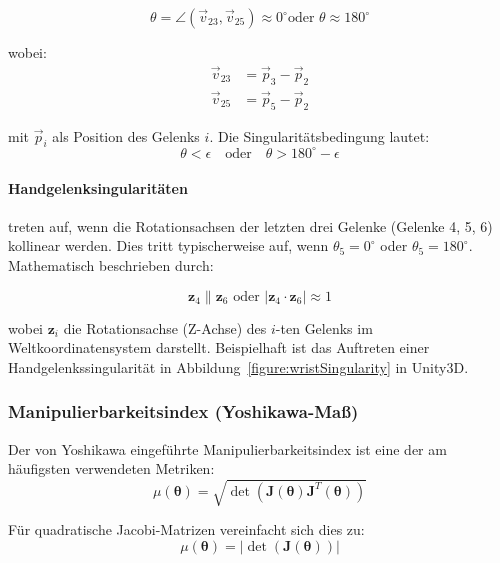 \begin{equation}
  \theta = \angle(\vec{v}_{23}, \vec{v}_{25}) \approx 0^\circ \text{
  oder } \theta \approx 180^\circ
  \label{eq:elbow_singularity}
\end{equation}

wobei:
\begin{align}
  \vec{v}_{23} & = \vec{p}_3 - \vec{p}_2 \\
  \vec{v}_{25} & = \vec{p}_5 - \vec{p}_2
\end{align}

mit $\vec{p}_i$ als Position des Gelenks $i$. Die Singularitätsbedingung lautet:
\begin{equation}
  \theta < \epsilon \quad \text{oder} \quad \theta > 180^\circ - \epsilon
\end{equation}

\paragraph{Handgelenksingularitäten} treten auf, wenn die Rotationsachsen der
letzten drei Gelenke (Gelenke 4, 5, 6) kollinear werden. Dies tritt
typischerweise auf, wenn $\theta_5 = 0^\circ$ oder $\theta_5 =
180^\circ$. Mathematisch
beschrieben durch:

\begin{equation}
  \mathbf{z}_4 \parallel \mathbf{z}_6 \text{ oder } |\mathbf{z}_4
  \cdot \mathbf{z}_6| \approx 1
  \label{eq:wrist_singularity}
\end{equation}

wobei $\mathbf{z}_i$ die Rotationsachse (Z-Achse) des $i$-ten Gelenks im
Weltkoordinatensystem darstellt. Beispielhaft ist das Auftreten einer
Handgelenkssingularität in Abbildung~\ref{figure:wristSingularity}
in Unity3D.

\subsubsection{Manipulierbarkeitsindex (Yoshikawa-Maß)} Der von Yoshikawa
\cite{yoshikawa1985manipulability} eingeführte Manipulierbarkeitsindex ist eine
der am häufigsten verwendeten Metriken:
\begin{equation}
  \mu(\boldsymbol{\theta}) =
  \sqrt{\det(\mathbf{J}(\boldsymbol{\theta})\mathbf{J}^T(\boldsymbol{\theta}))}
  \label{eq:yoshikawa_measure}
\end{equation}

Für quadratische Jacobi-Matrizen vereinfacht sich dies zu:
\begin{equation}
  \mu(\boldsymbol{\theta}) = |\det(\mathbf{J}(\boldsymbol{\theta}))|
  \label{eq:yoshikawa_simplified}
\end{equation}

